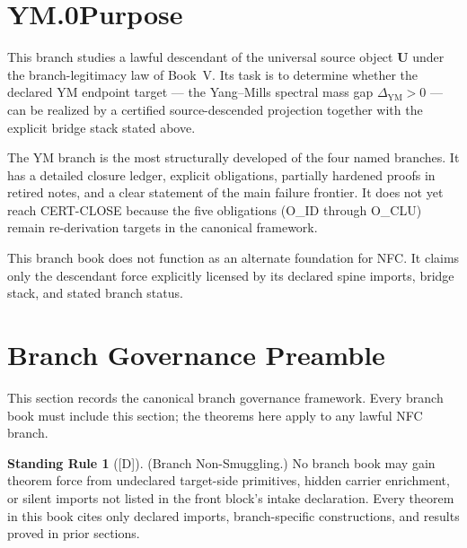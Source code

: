 \documentclass[12pt,oneside]{amsbook}
\theoremstyle{plain}
\theoremstyle{definition}
\newtheorem{standingrule}[theorem]{Standing Rule}
\theoremstyle{remark}
\newcommand{\status}[1]{\textup{[#1]}}
\begin{document}
\bigskip

\section*{YM.0\quad Purpose}

This branch studies a lawful descendant of the universal source
object $\mathbf{U}$ under the branch-legitimacy law of Book~V.
Its task is to determine whether the declared YM endpoint target
--- the Yang--Mills spectral mass gap $\Delta_{\mathrm{YM}} > 0$
--- can be realized by a certified source-descended projection
together with the explicit bridge stack stated above.

The YM branch is the most structurally developed of the four named
branches. It has a detailed closure ledger, explicit obligations,
partially hardened proofs in retired notes, and a clear statement
of the main failure frontier. It does not yet reach CERT-CLOSE
because the five obligations (O\_ID through O\_CLU) remain
re-derivation targets in the canonical framework.

This branch book does not function as an alternate foundation for
NFC. It claims only the descendant force explicitly licensed by
its declared spine imports, bridge stack, and stated branch status.

\section{Branch Governance Preamble}
\label{sec:governance}

This section records the canonical branch governance framework.
Every branch book must include this section; the theorems here
apply to any lawful NFC branch.

\begin{standingrule}[\status{D}]\label{sr:branch-no-smuggling}
\textup{(Branch Non-Smuggling.)} No branch book may gain theorem
force from undeclared target-side primitives, hidden carrier
enrichment, or silent imports not listed in the front block's
intake declaration. Every theorem in this book cites only declared
imports, branch-specific constructions, and results proved in prior
sections.
\end{standingrule}
\end{document}
